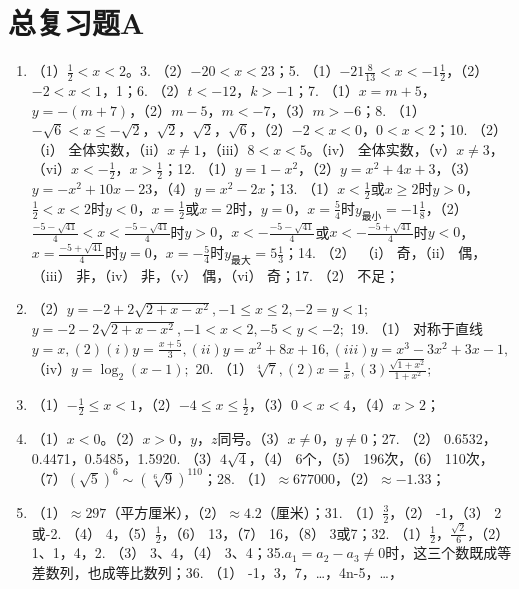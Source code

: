 \section{总复习题A}

\begin{enumerate}[start=4]
\item
  （1）\(\frac{1}{2} < x < 2\)。3. （2）\(-20 < x < 23\)；5.
  （1）\(-21\frac{8}{13} < x < -1\frac{1}{2}\)，（2）\(-2 < x < 1\)，1；6.
  （2）\(t < -12\)，\(k > -1\)；7.
  （1）\(x = m + 5\)，\(y = -(m + 7)\)，（2）\(m - 5\)，\(m < -7\)，（3）\(m > -6\)；8.
  （1）\(-\sqrt{6} < x \leqslant -\sqrt{2}\)，\(\sqrt{2}\)，\(\sqrt{2}\)，\(\sqrt{6}\)，（2）\(-2 < x < 0\)，\(0 < x < 2\)；10.
  （2） （i） 全体实数，（ii）\(x \neq 1\)，（iii）\(8 < x < 5\)。（iv）
  全体实数，（v）\(x \neq 3\)，（vi）\(x < -\frac{1}{2}\)，\(x > \frac{1}{2}\)；12.
  （1）\(y = 1 - x^2\)，（2）\(y = x^2 + 4x + 3\)，（3）\(y = -x^2 + 10x - 23\)，（4）\(y = x^2 - 2x\)；13.
  （1）\(x < \frac{1}{2}\)或\(x \geq 2\)时\(y > 0\)，\(\frac{1}{2} < x < 2\)时\(y < 0\)，\(x = \frac{1}{2}\)或\(x = 2\)时，\(y = 0\)，\(x = \frac{5}{4}\)时\(y_{\text{最小}} = -1\frac{1}{8}\)，（2）\(\frac{-5 - \sqrt{41}}{4} < x < \frac{-5 - \sqrt{41}}{4}\)时\(y > 0\)，\(x < -\frac{-5 - \sqrt{41}}{4}\)或\(x < -\frac{-5 + \sqrt{41}}{4}\)时\(y < 0\)，\(x = \frac{-5 + \sqrt{41}}{4}\)时\(y = 0\)，\(x = -\frac{5}{4}\)时\(y_{\text{最大}} = 5\frac{1}{3}\)；14.
  （2） （i） 奇，（ii） 偶，（iii） 非，（iv） 非，（v） 偶，（vi）
  奇；17. （2） 不足；
\item
  （2）\(y = -2 + 2\sqrt{2 + x - x^2}, -1 \leqslant x \leqslant 2, -2 = y < 1;\)
  \(y = -2 - 2\sqrt{2 + x - x^2}, -1 < x < 2, -5 < y < -2;\) 19. （1）
  对称于直线\(y = x, (2) (i) y = \frac{x + 5}{3}, (ii) y = x^2 + 8x + 16, (iii) y = x^3 - 3x^2 + 3x - 1,\)（iv）\(y = \log_2(x - 1);\)
  20.
  （1）\(\sqrt[4]{7}, (2) x = \frac{1}{x}, (3) \frac{\sqrt{1 + x^2}}{1 + x^2};\)
\item
  （1）\(-\frac{1}{2} \leqslant x < 1\)，（2）\(-4 \leqslant x \leqslant \frac{1}{2}\)，（3）\(0 < x < 4\)，（4）\(x > 2\)；
\item
  （1）\(x < 0\)。（2）\(x > 0\)，\(y\)，\(z\)同号。（3）\(x \neq 0\)，\(y \neq 0\)；27.
  （2） 0.6532，0.4471，0.5485，1.5920. （3）\(4 \sqrt{4}\)，（4）
  6个，（5） 196次，（6）
  110次，（7）\((\sqrt{5})^{6} \sim (\sqrt[6]{9})^{110}\)；28.
  （1）\(\approx 677000\)，（2）\(\approx -1.33\)；
\item
  （1）\(\approx 297\)（平方厘米），（2）\(\approx 4.2\)（厘米）；31.
  （1）\(\frac{3}{2}\)，（2） -1，（3） 2或-2. （4）
  4，（5）\(\frac{1}{2}\)，（6） 13，（7） 16，（8） 3或7；32.
  （1）\(\frac{1}{2}\)，\(\frac{\sqrt{2}}{6}\)，（2） 1、1，4，2. （3）
  3、4，（4）
  3、4；35.\(a_{1} = a_{2} - a_{3} \neq 0\)时，这三个数既成等差数列，也成等比数列；36.
  （1） -1，3，7，\ldots，4n-5，\ldots，
\end{enumerate}

